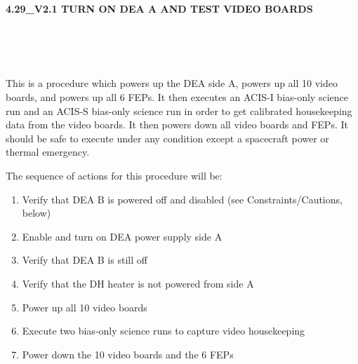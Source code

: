 \documentclass[11pt]{article}
\begin{document}
%
%
%
\newcommand{\be}{\begin{enumerate}}
\newcommand{\ee}{\end{enumerate}}
\newcommand{\bc}{\begin{center}}
\newcommand{\ec}{\end{center}}
\newcommand{\bi}{\begin{itemize}}
\newcommand{\ei}{\end{itemize}}
\newcommand{\bd}{\begin{description}}
\newcommand{\ed}{\end{description}}
\newcommand{\bt}{\begin{tabbing}}
\newcommand{\et}{\end{tabbing}}
\newcommand{\eg}{{\it e.g.~}}
\newcommand{\ie}{{\it i.e.~}}
\newcommand{\ul}{\underline}
\newcommand{\axaf}{{\em AXAF}}
\def\la{\hbox{\rlap{$<$}\lower0.5ex\hbox{$\sim$}\ }}


\large
\centerline {\bf 4.29\_V2.1 TURN ON DEA A AND TEST VIDEO BOARDS }
\vspace{0.25in}

\normalsize
{}\\
 \\


 \\
\normalsize

This is a procedure which powers up the DEA side A, powers up all 10 video boards, and powers up all 6 FEPs. It then executes an ACIS-I bias-only science run and an ACIS-S bias-only science run in order to get calibrated housekeeping data from the video boards. It then powers down all video boards and FEPs. It should be safe to execute under any condition except a spacecraft power or thermal emergency.

\vspace{0.25in}
\noindent The sequence of actions for this procedure will be:
\be
\item Verify that DEA B is powered off and disabled (see Constraints/Cautions, below)
\vspace{-0.10in}
\item Enable and turn on DEA power supply side A
\vspace{-0.10in}
\item Verify that DEA B is still off
\vspace{-0.10in}
\item Verify that the DH heater is not powered from side A
\vspace{-0.10in}
\item Power up all 10 video boards
\vspace{-0.10in}
\item Execute two bias-only science runs to capture video housekeeping
\vspace{-0.10in}
\item Power down the 10 video boards and the 6 FEPs
\ee
\end{document}

